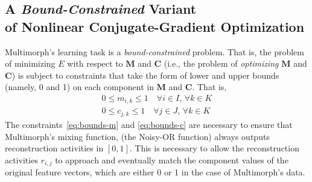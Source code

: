 \subsection{A \textit{Bound-Constrained} Variant \\ of Nonlinear Conjugate-Gradient Optimization}
\label{sec:active-set}
Multimorph's learning task is a \emph{bound-constrained} problem. That is,
the problem of minimizing $E$ with respect to $\mathbf{M}$ and $\mathbf{C}$ 
(i.e., the problem of \emph{optimizing}  $\mathbf{M}$ and $\mathbf{C}$) is 
subject to constraints that take the form of 
lower and upper bounds (namely, 0 and 1) on each component in 
$\mathbf{M}$ and $\mathbf{C}$. That is,
\begin{align}
\label{eq:bounds-m}
0 \le m_{i,k} \le 1 \quad \text{$\forall i \in I$, $\forall k \in K$} \\
\label{eq:bounds-c}
0 \le c_{j,k} \le 1 \quad \text{$\forall j \in J$, $\forall k  \in K$}
\end{align}
The constraints~\eqref{eq:bounds-m} and \eqref{eq:bounds-c} are necessary to ensure that Multimorph's mixing function, (the Noisy-OR function) always outputs reconstruction activities in $[0,1]$.
This is necessary to allow the reconstruction activities $r_{i,j}$ to approach 
and eventually match the component values of the original feature vectors, which are either 0 or 1 in the case of Multimorph's data.
%

